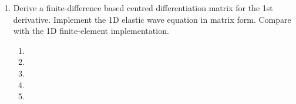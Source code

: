 \begin{enumerate}
\begin{enumerate}
\item[] 
\item[]
\item[] 
\end{enumerate}
\item
Derive a finite-difference based centred differentiation matrix for the 1st derivative. Implement the 1D elastic wave equation in matrix form. Compare with the 1D finite-element implementation. 
\begin{enumerate}
\item[]
\item[]
\item[] 
\item[]
\item[] 
\end{enumerate}
\end{enumerate}